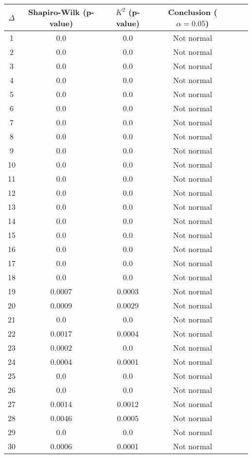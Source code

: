 \begin{table}[h]
	\begin{tabular}{|c|c|c|c|c|c|}
		\hline
		$\Delta$ & Shapiro-Wilk (p-value) & $K^2$ (p-value) & Conclusion ($\alpha = 0.05$)\\\hline
		\hline
		1 & 0.0 & 0.0 & Not normal\\\hline
		2 & 0.0 & 0.0 & Not normal\\\hline
		3 & 0.0 & 0.0 & Not normal\\\hline
		4 & 0.0 & 0.0 & Not normal\\\hline
		5 & 0.0 & 0.0 & Not normal\\\hline
		6 & 0.0 & 0.0 & Not normal\\\hline
		7 & 0.0 & 0.0 & Not normal\\\hline
		8 & 0.0 & 0.0 & Not normal\\\hline
		9 & 0.0 & 0.0 & Not normal\\\hline
		10 & 0.0 & 0.0 & Not normal\\\hline
		11 & 0.0 & 0.0 & Not normal\\\hline
		12 & 0.0 & 0.0 & Not normal\\\hline
		13 & 0.0 & 0.0 & Not normal\\\hline
		14 & 0.0 & 0.0 & Not normal\\\hline
		15 & 0.0 & 0.0 & Not normal\\\hline
		16 & 0.0 & 0.0 & Not normal\\\hline
		17 & 0.0 & 0.0 & Not normal\\\hline
		18 & 0.0 & 0.0 & Not normal\\\hline
		19 & 0.0007 & 0.0003 & Not normal\\\hline
		20 & 0.0009 & 0.0029 & Not normal\\\hline
		21 & 0.0 & 0.0 & Not normal\\\hline
		22 & 0.0017 & 0.0004 & Not normal\\\hline
		23 & 0.0002 & 0.0 & Not normal\\\hline
		24 & 0.0004 & 0.0001 & Not normal\\\hline
		25 & 0.0 & 0.0 & Not normal\\\hline
		26 & 0.0 & 0.0 & Not normal\\\hline
		27 & 0.0014 & 0.0012 & Not normal\\\hline
		28 & 0.0046 & 0.0005 & Not normal\\\hline
		29 & 0.0 & 0.0 & Not normal\\\hline
		30 & 0.0006 & 0.0001 & Not normal\\\hline

\end{tabular}
\end{table}
